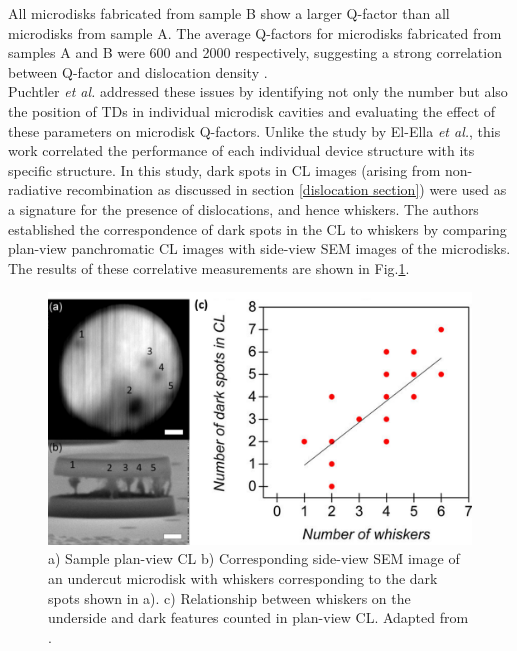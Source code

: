 All microdisks fabricated from sample B show a larger Q-factor than all microdisks from sample A. The average Q-factors for microdisks fabricated from samples A and B were 600 and 2000 respectively, suggesting a strong correlation between Q-factor and dislocation density \cite{El-Ella2011}.\\
Puchtler \textit{et al.} addressed these issues by identifying not only the number but also the position of TDs in individual microdisk cavities and evaluating the effect of these parameters on microdisk Q-factors\cite{Puchtler2015}.  Unlike the study by El-Ella \textit{et al.}, this work correlated the performance of each individual device structure with its specific structure. In this study, dark spots in CL images (arising from non-radiative recombination as discussed in section \ref{dislocation section}) were used as a signature for the presence of dislocations, and hence whiskers.  The authors established the correspondence of dark spots in the CL to whiskers by comparing plan-view panchromatic CL images with side-view SEM images of the microdisks. The results of these correlative measurements are shown in Fig.\ref{puchtlerdislocation}.

\begin{figure}[h]
	\centering
	\includegraphics[width=1\textwidth]{Figs/Ch4/puchtlerdislocation.png}
	\caption {a) Sample plan-view CL b) Corresponding side-view SEM image of an undercut microdisk with whiskers corresponding to the dark spots shown in a). c) Relationship between whiskers on the underside and dark features counted in plan-view CL. Adapted from \cite{Puchtler2015}.}
	\label{puchtlerdislocation}
\end{figure}
\FloatBarrier 
